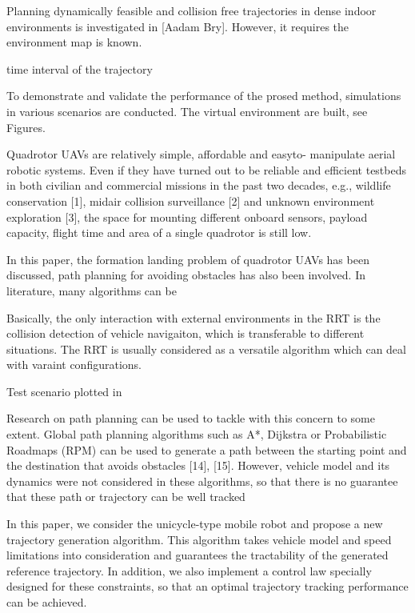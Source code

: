 \documentclass[a4paper]{report}
\begin{document}
Planning dynamically feasible and collision free trajectories in dense indoor environments is investigated in [Aadam Bry]. However, it requires the environment map is known.

time interval of the trajectory 

To demonstrate and validate the performance of the prosed method, simulations in various scenarios are conducted.
The virtual environment are built, see Figures.

Quadrotor UAVs are relatively simple, affordable and easyto-
manipulate aerial robotic systems. Even if they have turned
out to be reliable and efficient testbeds in both civilian and
commercial missions in the past two decades, e.g., wildlife
conservation [1], midair collision surveillance [2] and unknown
environment exploration [3], the space for mounting different
onboard sensors, payload capacity, flight time and area of a
single quadrotor is still low.

In this paper, the formation landing problem of quadrotor
UAVs has been discussed, path planning for avoiding obstacles
has also been involved. In literature, many algorithms can be

Basically, the only interaction with external environments
in the RRT is the collision detection of vehicle
navigaiton, which is transferable to different situations. The
RRT is usually considered as a versatile algorithm which can
deal with varaint configurations.

Test scenario plotted in

Research on path planning can be used to tackle with this
concern to some extent. Global path planning algorithms such as
A*, Dijkstra or Probabilistic Roadmaps (RPM) can be used to
generate a path between the starting point and the destination
that avoids obstacles [14], [15]. However, vehicle model and its
dynamics were not considered in these algorithms, so that there
is no guarantee that these path or trajectory can be well tracked

In this paper, we consider the unicycle-type mobile robot and
propose a new trajectory generation algorithm. This algorithm
takes vehicle model and speed limitations into consideration and
guarantees the tractability of the generated reference trajectory.
In addition, we also implement a control law specially designed
for these constraints, so that an optimal trajectory tracking
performance can be achieved. 
\end{document}
